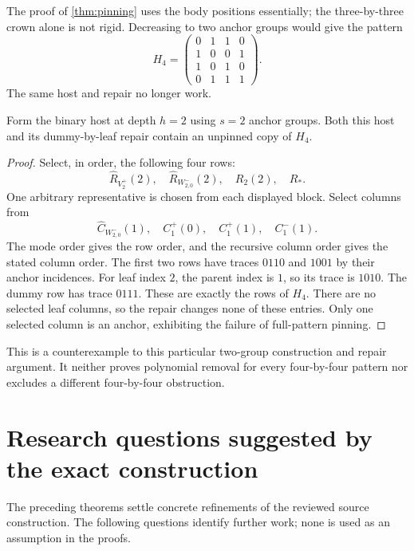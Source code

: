 The proof of \cref{thm:pinning} uses the body positions essentially;
the three-by-three crown alone is not rigid. Decreasing to two anchor
groups would give the pattern
\begin{equation}
 H_4=\begin{pmatrix}
 0&1&1&0\\1&0&0&1\\1&0&1&0\\0&1&1&1
 \end{pmatrix}.
 \label{eq:H4}
\end{equation}
The same host and repair no longer work.

\begin{proposition}
\label{prop:H4-counterexample}
Form the binary host at depth \(h=2\) using \(s=2\) anchor groups.
Both this host and its dummy-by-leaf repair contain an unpinned copy
of \(H_4\).
\end{proposition}
\begin{proof}
Select, in order, the following four rows:
\[
 \widehat R_{V_2^+}(2),\quad
 \widehat R_{W_{2,0}^-}(2),\quad R_2(2),\quad R_*.
\]
One arbitrary representative is chosen from each displayed block.
Select columns from
\[
 \widehat C_{W_{2,0}^-}(1),\quad
 C_1^+(0),\quad C_1^+(1),\quad C_1^-(1).
\]
The mode order gives the row order, and the recursive column order
gives the stated column order. The first two rows have traces
\(0110\) and \(1001\) by their anchor incidences. For leaf index
\(2\), the parent index is \(1\), so its trace is \(1010\).
The dummy row has trace \(0111\). These are exactly the rows of
\(H_4\). There are no selected leaf columns, so the repair changes
none of these entries. Only one selected column is an anchor,
exhibiting the failure of full-pattern pinning.
\end{proof}

This is a counterexample to this particular two-group construction
and repair argument. It neither proves polynomial removal for every
four-by-four pattern nor excludes a different four-by-four obstruction.

\section{Research questions suggested by the exact construction}
\label{sec:questions}

The preceding theorems settle concrete refinements of the reviewed
source construction. The following questions identify further work;
none is used as an assumption in the proofs.

